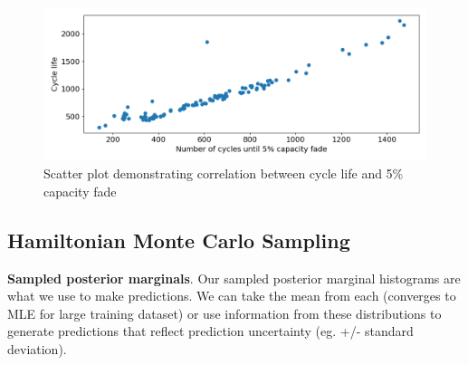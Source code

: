 \documentclass{article}
\begin{document}
    \begin{figure}[H]
        \centering
        \includegraphics[scale=0.5] {figs/correlation_cycle_life_vs_5pct_fade.png}
        \caption{Scatter plot demonstrating correlation between cycle life and 5\% capacity fade}
        \label{fig:1e}
    \end{figure}


\subsection{Hamiltonian Monte Carlo Sampling}

\textbf{Sampled posterior marginals}. Our sampled posterior marginal histograms are what we use to make predictions. We can take the mean from each (converges to MLE for large training dataset) or use information from these distributions to generate predictions that reflect prediction uncertainty (eg. +/- standard deviation). 
\end{document}
